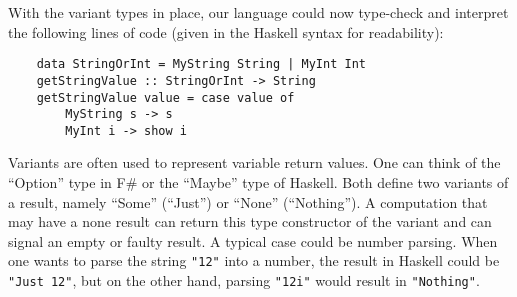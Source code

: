 With the variant types in place, our language could now type-check and interpret
the following lines of code (given in the Haskell syntax for readability):

\begin{verbatim}
    data StringOrInt = MyString String | MyInt Int
    getStringValue :: StringOrInt -> String
    getStringValue value = case value of
        MyString s -> s
        MyInt i -> show i
\end{verbatim}

Variants are often used to represent variable return values.
One can think of the ``Option'' type in F\# or the ``Maybe'' type
of Haskell. Both define two variants of a result, namely ``Some'' (``Just'')
or ``None'' (``Nothing''). A computation that may have a none result can return
this type constructor of the variant and can signal an empty or faulty result.
A typical case could be number parsing. When one wants to parse the string
\texttt{"12"} into a number, the result in Haskell could be \texttt{"Just 12"}, but
on the other hand, parsing \texttt{"12i"} would result in \texttt{"Nothing"}.
